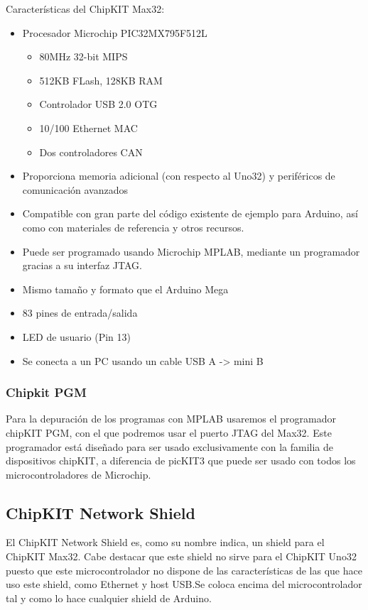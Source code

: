Características del ChipKIT Max32:
\begin{itemize}
	\item Procesador Microchip PIC32MX795F512L
		\begin{itemize}
			\item 80MHz 32-bit MIPS
			\item 512KB FLash, 128KB RAM
			\item Controlador USB 2.0 OTG
			\item 10/100 Ethernet MAC
			\item Dos controladores CAN
		\end{itemize}
	\item Proporciona memoria adicional (con respecto al Uno32) y periféricos de comunicación avanzados
	\item Compatible con gran parte del código existente de ejemplo para Arduino, así como con materiales de referencia y otros recursos.
	\item Puede ser programado usando Microchip MPLAB, mediante un programador gracias a su interfaz JTAG.
	\item Mismo tamaño y formato que el Arduino Mega
	\item 83 pines de entrada/salida
	\item LED de usuario (Pin 13)
	\item Se conecta a un PC usando un cable USB A -> mini B
\end{itemize}

\subsubsection{Chipkit PGM}
Para la depuración de los programas con MPLAB usaremos el programador chipKIT PGM\cite{website:pgm}, con el que podremos usar el puerto JTAG del Max32. Este programador está diseñado para ser usado exclusivamente con la familia de dispositivos chipKIT, a diferencia de picKIT3\cite{website:pickit} que puede ser usado con todos los microcontroladores de Microchip.


\newpage

\subsection{ChipKIT Network Shield}

El ChipKIT Network Shield es, como su nombre indica, un shield para el ChipKIT Max32. Cabe destacar que este shield no sirve para el ChipKIT Uno32 puesto que este microcontrolador no dispone de las características de las que hace uso este shield, como Ethernet y host USB.Se coloca encima del microcontrolador tal y como lo hace cualquier shield de Arduino.

